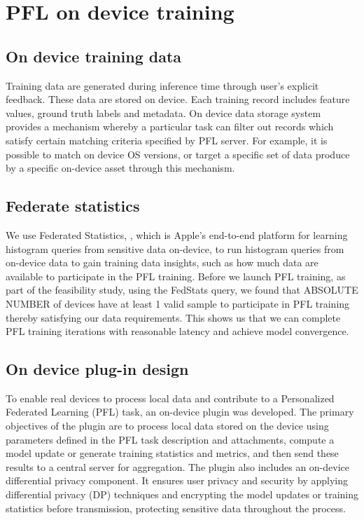 \section{PFL on device training}

\subsection{On device training data}

Training data are generated during inference time through user's explicit feedback.  These data are stored on device. Each training record includes feature values, ground truth labels and metadata. On device data storage system provides a mechanism whereby a particular task can filter out records which satisfy certain matching criteria specified by PFL server. For example, it is possible to match on device OS versions, or target a specific set of data produce by a specific on-device asset through this mechanism.  

\subsection{Federate statistics}

We use Federated Statistics, \cite{CorriganGibbs2017PrioPR}, which is Apple’s end-to-end platform for learning histogram queries from sensitive data on-device, to run histogram queries from on-device data to gain training data insights, such as how much data are available to participate in the PFL training. Before we launch PFL training, as part of the feasibility study, using the FedStats query, we found that ABSOLUTE NUMBER of devices have at least 1 valid sample to participate in PFL training thereby satisfying our data requirements. This shows us that we can complete PFL training iterations with reasonable latency and achieve model convergence. 

\subsection{On device plug-in design}

To enable real devices to process local data and contribute to a Personalized Federated Learning (PFL) task, an on-device plugin was developed. The primary objectives of the plugin are to process local data stored on the device using parameters defined in the PFL task description and attachments, compute a model update or generate training statistics and metrics, and then send these results to a central server for aggregation.
The plugin also includes an on-device differential privacy component. It ensures user privacy and security by applying differential privacy (DP) techniques and encrypting the model updates or training statistics before transmission, protecting sensitive data throughout the process.

